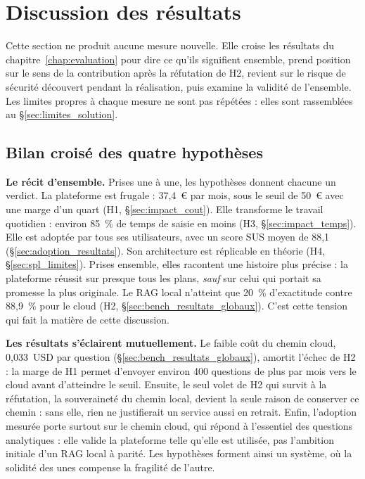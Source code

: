\section{Discussion des résultats}
\label{chap:discussion}

Cette section ne produit aucune mesure nouvelle. Elle croise les résultats du chapitre~\ref{chap:evaluation} pour dire ce qu'ils signifient ensemble, prend position sur le sens de la contribution après la réfutation de H2, revient sur le risque de sécurité découvert pendant la réalisation, puis examine la validité de l'ensemble. Les limites propres à chaque mesure ne sont pas répétées : elles sont rassemblées au §\ref{sec:limites_solution}.

\subsection{Bilan croisé des quatre hypothèses}
\label{sec:disc_bilan}

\textbf{Le récit d'ensemble.} Prises une à une, les hypothèses donnent chacune un verdict. La plateforme est frugale : 37,4~€ par mois, sous le seuil de 50~€ avec une marge d'un quart (H1, §\ref{sec:impact_cout}). Elle transforme le travail quotidien : environ 85~\% de temps de saisie en moins (H3, §\ref{sec:impact_temps}). Elle est adoptée par tous ses utilisateurs, avec un score SUS moyen de 88,1 (§\ref{sec:adoption_resultats}). Son architecture est réplicable en théorie (H4, §\ref{sec:spl_limites}). Prises ensemble, elles racontent une histoire plus précise : la plateforme réussit sur presque tous les plans, \emph{sauf} sur celui qui portait sa promesse la plus originale. Le RAG local n'atteint que 20~\% d'exactitude contre 88,9~\% pour le cloud (H2, §\ref{sec:bench_resultats_globaux}). C'est cette tension qui fait la matière de cette discussion.

\textbf{Les résultats s'éclairent mutuellement.} Le faible coût du chemin cloud, 0,033~USD par question (§\ref{sec:bench_resultats_globaux}), amortit l'échec de H2 : la marge de H1 permet d'envoyer environ 400 questions de plus par mois vers le cloud avant d'atteindre le seuil. Ensuite, le seul volet de H2 qui survit à la réfutation, la souveraineté du chemin local, devient la seule raison de conserver ce chemin : sans elle, rien ne justifierait un service aussi en retrait. Enfin, l'adoption mesurée porte surtout sur le chemin cloud, qui répond à l'essentiel des questions analytiques : elle valide la plateforme telle qu'elle est utilisée, pas l'ambition initiale d'un RAG local à parité. Les hypothèses forment ainsi un système, où la solidité des unes compense la fragilité de l'autre.

